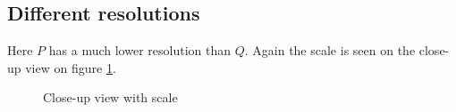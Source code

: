 {\FloatBarrier


\subsection{Different resolutions}
Here $P$ has a much lower resolution than $Q$. Again the scale is seen on the close-up view on figure \ref{fig:t3_scale}.

\begin{figure}[h]
\center
{
\setlength{\fboxsep}{0pt}%
\setlength{\fboxrule}{0.5pt}%
}
\caption{Close-up view with scale}
\label{fig:t3_scale}
\end{figure}


}
